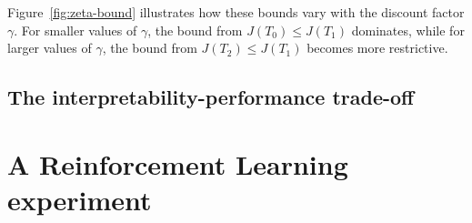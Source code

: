 Figure~\ref{fig:zeta-bound} illustrates how these bounds vary with the discount factor $\gamma$. For smaller values of $\gamma$, the bound from $J(T_0) \leq J(T_1)$ dominates, while for larger values of $\gamma$, the bound from $J(T_2) \leq J(T_1)$ becomes more restrictive.

\subsection{The interpretability-performance trade-off}

\section{A Reinforcement Learning experiment}

